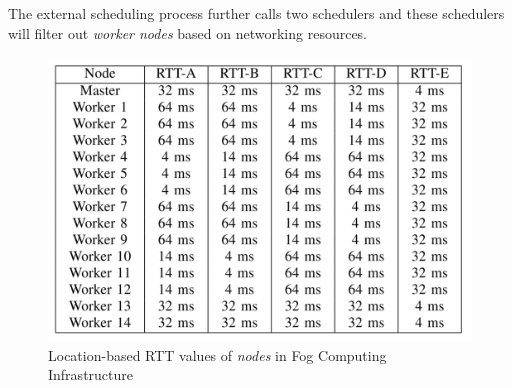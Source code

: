 The external scheduling process further calls two schedulers and these schedulers will filter out \emph{worker  nodes} based on networking resources.
\begin{figure}
  \centering
  \includegraphics[width=\linewidth]{figures/mlcn-k8s-rtt.pdf}
  \caption{Location-based RTT values of \emph{nodes} in Fog Computing Infrastructure\cite{Santos2019}}
  \label{fig:k8s-rtt}
\end{figure}
